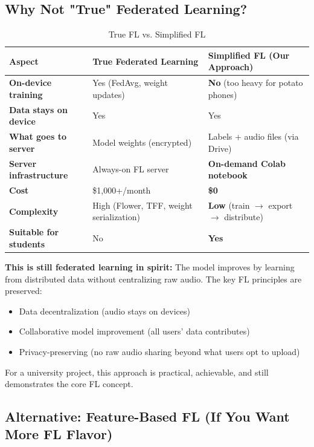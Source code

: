 \documentclass[11pt,a4paper]{article}
\begin{document}
\subsection{Why Not "True" Federated Learning?}

\begin{table}[h]
\centering
\caption{True FL vs. Simplified FL}
\begin{tabular}{@{}p{4cm}p{4cm}p{4cm}@{}}
\toprule
\textbf{Aspect} & \textbf{True Federated Learning} & \textbf{Simplified FL (Our Approach)} \\
\midrule
\textbf{On-device training} & Yes (FedAvg, weight updates) & \textbf{No} (too heavy for potato phones) \\
\textbf{Data stays on device} & Yes & Yes \\
\textbf{What goes to server} & Model weights (encrypted) & Labels + audio files (via Drive) \\
\textbf{Server infrastructure} & Always-on FL server & \textbf{On-demand Colab notebook} \\
\textbf{Cost} & \$1,000+/month & \textbf{\$0} \\
\textbf{Complexity} & High (Flower, TFF, weight serialization) & \textbf{Low} (train $\rightarrow$ export $\rightarrow$ distribute) \\
\textbf{Suitable for students} & No & \textbf{Yes} \\
\bottomrule
\end{tabular}
\end{table}

\begin{highlightbox}
\textbf{This is still federated learning in spirit:} The model improves by learning from distributed data without centralizing raw audio. The key FL principles are preserved:
\begin{itemize}
    \item Data decentralization (audio stays on devices)
    \item Collaborative model improvement (all users' data contributes)
    \item Privacy-preserving (no raw audio sharing beyond what users opt to upload)
\end{itemize}
For a university project, this approach is practical, achievable, and still demonstrates the core FL concept.
\end{highlightbox}

\subsection{Alternative: Feature-Based FL (If You Want More FL Flavor)}
\end{document}
